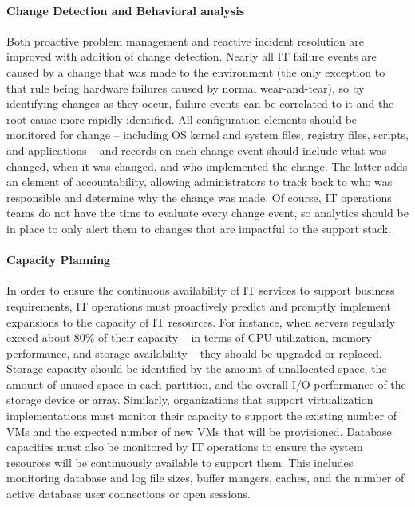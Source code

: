 \documentclass[8pt]{extarticle}
\begin{document}
\begin{multicols}{3}
\paragraph{Change Detection and Behavioral analysis}
Both proactive problem management and reactive incident resolution are improved with addition of
change detection. Nearly all IT failure events are caused by a change that was made to the environment
(the only exception to that rule being hardware failures caused by normal wear-and-tear), so by
identifying changes as they occur, failure events can be correlated to it and the root cause more rapidly
identified. All configuration elements should be monitored for change – including OS kernel and
system files, registry files, scripts, and applications – and records on each change event should include
what was changed, when it was changed, and who implemented the change. The latter adds an element
of accountability, allowing administrators to track back to who was responsible and determine why the
change was made. Of course, IT operations teams do not have the time to evaluate every change event,
so analytics should be in place to only alert them to changes that are impactful to the support stack.


\paragraph{Capacity Planning}
In order to ensure the continuous availability of IT services to support business requirements, IT
operations must proactively predict and promptly implement expansions to the capacity of IT resources.
For instance, when servers regularly exceed about 80\% of their capacity – in terms of CPU utilization,
memory performance, and storage availability – they should be upgraded or replaced. Storage capacity
should be identified by the amount of unallocated space, the amount of unused space in each partition,
and the overall I/O performance of the storage device or array. Similarly, organizations that support
virtualization implementations must monitor their capacity to support the existing number of VMs
and the expected number of new VMs that will be provisioned. Database capacities must also be
monitored by IT operations to ensure the system resources will be continuously available to support
them. This includes monitoring database and log file sizes, buffer mangers, caches, and the number of
active database user connections or open sessions.


\end{multicols}
\end{document}
